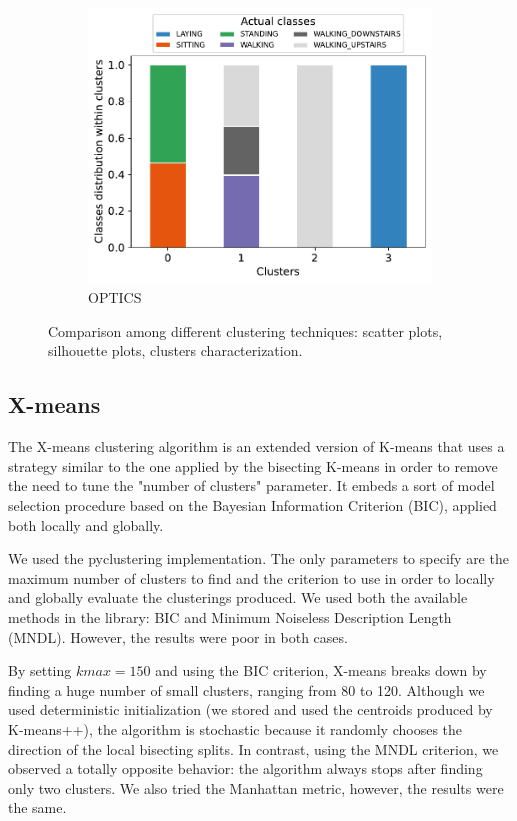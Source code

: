 \documentclass[10pt, a4paper, twocolumn]{article}
\begin{document}
\begin{figure}[t]
\begin{subfigure}[t]{0.196\textwidth}
        \includegraphics[width=\linewidth]{immagini simone/optics_distr.pdf}
        \caption{OPTICS}
        \label{fig:optics_distr}
    \end{subfigure}
\caption{Comparison among different clustering techniques: scatter plots, silhouette plots, clusters characterization.}
\label{fig:clusterings_comparison}

\end{figure}

\subsection*{X-means}

The X-means clustering algorithm is an extended version of K-means that uses a strategy similar to the one applied by the bisecting K-means in order to remove the need to tune the "number of clusters" parameter. It embeds a sort of model selection procedure based on the Bayesian Information Criterion (BIC), applied both locally and globally. 

We used the pyclustering implementation. The only parameters to specify are the maximum number of clusters to find and the criterion to use in order to locally and globally evaluate the clusterings produced. We used both the available methods in the library: BIC and Minimum Noiseless Description Length (MNDL). However, the results were poor in both cases. 

By setting $kmax=150$ and using the BIC criterion, X-means breaks down by finding a huge number of small clusters, ranging from 80 to 120. Although we used deterministic initialization (we stored and used the centroids produced by K-means++), the algorithm is stochastic because it randomly chooses the direction of the local bisecting splits. In contrast, using the MNDL criterion, we observed a totally opposite behavior: the algorithm always stops after finding only two clusters. We also tried the Manhattan metric, however, the results were the same.
\end{document}
